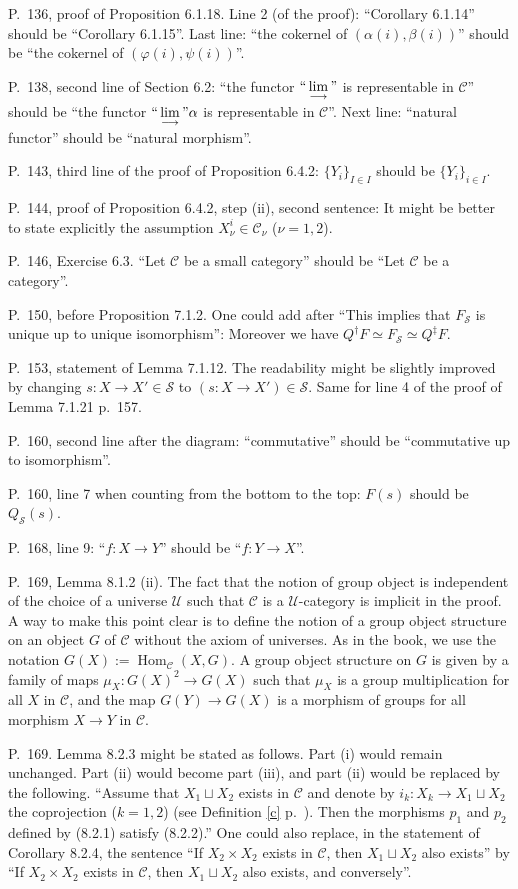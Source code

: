 \documentclass[12pt]{article}
\theoremstyle{remark}
\theoremstyle{definition}
\newcommand{\n}{\noindent}
\newcommand{\C}{\mathcal C}
\newcommand{\SSS}{\mathcal S}
\newcommand{\U}{\mathcal U}
\newcommand{\p}{\varphi}
\DeclareMathOperator{\Hom}{Hom}
\begin{document}
\n P.~136, proof of Proposition 6.1.18. Line 2 (of the proof): ``Corollary 6.1.14'' should be ``Corollary 6.1.15''. Last line: ``the cokernel of $(\alpha(i),\beta(i))$'' should be ``the cokernel of $(\p(i),\psi(i))$''. 

\n P.~138, second line of Section 6.2: ``the functor $``\displaystyle\lim_{\longrightarrow}"$ is representable in $\C$'' should be ``the functor $``\displaystyle\lim_{\longrightarrow}"\alpha$ is representable in $\C$''. Next line: ``natural functor'' should be ``natural morphism''. 

\n P.~143, third line of the proof of Proposition 6.4.2: $\{Y_i\}_{I\in I}$ should be $\{Y_i\}_{i\in I}$. 

\n P.~144, proof of Proposition 6.4.2, step (ii), second sentence: It might be better to state explicitly the assumption $X_\nu^i\in\C_\nu$ ($\nu=1,2$). 

\n P.~146, Exercise 6.3. ``Let $\C$ be a small category'' should be ``Let $\C$ be a category''. 

\n P.~150, before Proposition 7.1.2. One could add after ``This implies that $F_{\SSS}$ is unique up to unique isomorphism'': Moreover we have $Q^\dagger F\simeq F_{\SSS}\simeq Q^\ddagger F$. 

\n P.~153, statement of Lemma 7.1.12. The readability might be slightly improved by changing $s:X\to X'\in\mathcal S$ to $(s:X\to X')\in\mathcal S$. Same for line 4 of the proof of Lemma 7.1.21 p.~157.  

\n P.~160, second line after the diagram: ``commutative'' should be ``commutative up to isomorphism''.

\n P.~160, line 7 when counting from the bottom to the top: $F(s)$ should be $Q_{\mathcal S}(s)$. 

\n P.~168, line 9: ``$f:X\to Y$'' should be ``$f:Y\to X$''. 

\n P.~169, Lemma 8.1.2 (ii). The fact that the notion of group object is independent of the choice of a universe $\U$ such that $\C$ is a $\U$-category is implicit in the proof. A way to make this point clear is to define the notion of a group object structure on an object $G$ of $\C$ without the axiom of universes. As in the book, we use the notation $G(X):=\Hom_\C(X,G)$. A group object structure on $G$ is given by a family of maps $\mu_X:G(X)^2\to G(X)$ such that $\mu_X$ is a group multiplication for all $X$ in $\C$, and the map $G(Y)\to G(X)$ is a morphism of groups for all morphism $X\to Y$ in $\C$. 

\n P.~169. Lemma 8.2.3 might be stated as follows. Part (i) would remain unchanged. Part (ii) would become part (iii), and part (ii) would be replaced by the following. ``Assume that $X_1\sqcup X_2$ exists in $\C$ and denote by $i_k:X_k\to X_1\sqcup X_2$ the coprojection ($k=1,2$) (see Definition \ref{c} p.~\pageref{c}). Then the morphisms $p_1$ and $p_2$ defined by (8.2.1) satisfy (8.2.2).'' One could also replace, in the statement of Corollary 8.2.4, the sentence ``If $X_2\times X_2$ exists in $\C$, then $X_1\sqcup X_2$ also exists'' by ``If $X_2\times X_2$ exists in $\C$, then $X_1\sqcup X_2$ also exists, and conversely''. 
\end{document}
